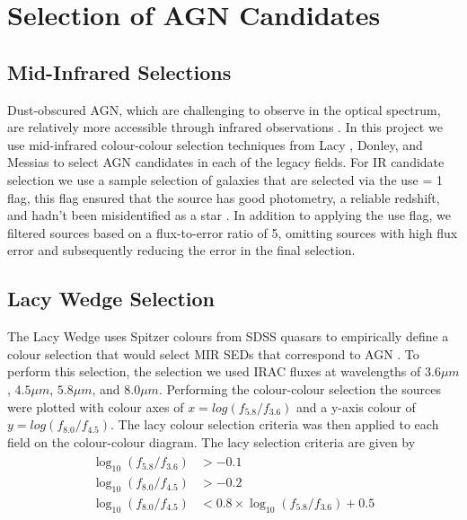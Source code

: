 \documentclass[11pt]{iopart}
\begin{document}
\section{Selection of AGN Candidates}
\subsection{Mid-Infrared Selections}
Dust-obscured AGN, which are challenging to observe in the optical spectrum, are relatively more accessible through infrared observations \cite{yutani_origin_2022}. In this project we use mid-infrared colour-colour selection techniques from Lacy \cite{lacy_obscured_2004, lacy_optical_2007}, Donley\cite{donley_spitzer_2007, donley_identifying_2012}, and Messias \cite{messias_new_2012, messias_dependency_2014}  to select AGN candidates in each of the legacy fields. For IR candidate selection we use a sample selection of galaxies that are selected via the use = 1 flag, this flag ensured that the source has good photometry, a reliable redshift, and hadn't been misidentified as a star \cite{straatman_fourstar_2016}. In addition to applying the use flag, we filtered sources based on a flux-to-error ratio of 5, omitting sources with high flux error and subsequently reducing the error in the final selection.
\subsection{Lacy Wedge Selection}
The Lacy Wedge uses Spitzer colours from SDSS quasars to empirically define a colour selection that would select MIR SEDs that correspond to AGN \cite{lacy_obscured_2004}. To perform this selection, the selection we used IRAC fluxes at wavelengths of $3.6\mu m$, $4.5\mu m$, $5.8\mu m$, and $8.0\mu m$. Performing the colour-colour selection the sources were plotted with colour axes of $x = log(f_{5.8}/f_{3.6})$ and a y-axis colour of $y =log(f_{8.0}/f_{4.5})$. The lacy colour selection criteria was then applied to each field on the colour-colour diagram. The lacy selection criteria are given by
\begin{align*}
    \begin{split}
       \log_{10}\left(f_{5.8}/f_{3.6}\right)&>-0.1\\
       \log_{10}\left(f_{8.0}/f_{4.5}\right)&>-0.2\\
       \log_{10}\left(f_{8.0}/f_{4.5}\right)&<0.8\times\log_{10}\left(f_{5.8}/f_{3.6}\right)+0.5
    \end{split}
\end{align*}
\end{document}
